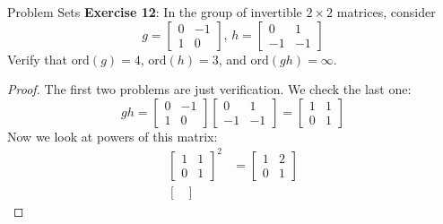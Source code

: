 \documentclass{report}
\begin{document}
\begin{exercises}{Problem Sets}
    \textbf{Exercise 12}: In the group of invertible $2 \times 2$ matrices, consider
        \begin{equation*}
            g = \begin{bmatrix}
                0 & -1 \\
                1 & 0    
            \end{bmatrix}, \, 
            h = \begin{bmatrix}
                0  & 1  \\
                -1 & -1   
            \end{bmatrix}
        \end{equation*}
    Verify that $\text{ord}(g) = 4$, $\text{ord}(h) = 3$, and $\text{ord}(gh) = \infty$.
        \begin{proof}
            The first two problems are just verification. We check the last one:
                \begin{equation*}
                    gh = \begin{bmatrix}
                        0 & -1 \\
                        1 & 0    
                    \end{bmatrix}
                    \begin{bmatrix}
                        0  & 1  \\
                        -1 & -1   
                    \end{bmatrix} =
                    \begin{bmatrix}
                        1 & 1 \\
                        0 & 1   
                    \end{bmatrix}
                \end{equation*}
            Now we look at powers of this matrix:
                \begin{align*}
                    \begin{bmatrix}
                        1 & 1 \\
                        0 & 1   
                    \end{bmatrix}^{2} &= 
                    \begin{bmatrix}
                        1 & 2 \\
                        0 & 1   
                    \end{bmatrix} \\
                    \begin{bmatrix}

\end{bmatrix}
\end{align*}
\end{proof}
\end{exercises}
\end{document}
